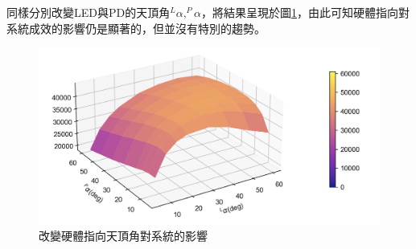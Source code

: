 同樣分別改變LED與PD的天頂角$^L \alpha,^P \alpha$，將結果呈現於圖\ref{pic:num5 alpha surface}，由此可知硬體指向對系統成效的影響仍是顯著的，但並沒有特別的趨勢。

\begin{figure}[htpb]
    \centering
    \includegraphics[width=15cm]{ch4pic/num5 alpha surface.png}
    \caption{改變硬體指向天頂角對系統的影響}
    \label{pic:num5 alpha surface}
\end{figure}








